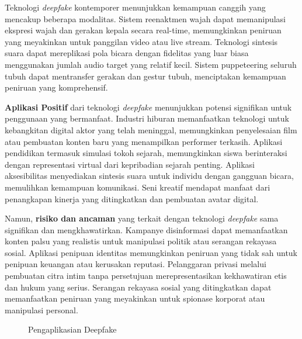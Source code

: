 Teknologi \textit{deepfake} kontemporer menunjukkan kemampuan canggih yang mencakup beberapa modalitas. Sistem reenaktmen wajah dapat memanipulasi ekspresi wajah dan gerakan kepala secara real-time, memungkinkan peniruan yang meyakinkan untuk panggilan video atau live stream. Teknologi sintesis suara dapat mereplikasi pola bicara dengan fidelitas yang luar biasa menggunakan jumlah audio target yang relatif kecil. Sistem puppeteering seluruh tubuh dapat mentransfer gerakan dan gestur tubuh, menciptakan kemampuan peniruan yang komprehensif.

\textbf{Aplikasi Positif} dari teknologi \textit{deepfake} menunjukkan potensi signifikan untuk penggunaan yang bermanfaat. Industri hiburan memanfaatkan teknologi untuk kebangkitan digital aktor yang telah meninggal, memungkinkan penyelesaian film atau pembuatan konten baru yang menampilkan performer terkasih. Aplikasi pendidikan termasuk simulasi tokoh sejarah, memungkinkan siswa berinteraksi dengan representasi virtual dari kepribadian sejarah penting. Aplikasi aksesibilitas menyediakan sintesis suara untuk individu dengan gangguan bicara, memulihkan kemampuan komunikasi. Seni kreatif mendapat manfaat dari penangkapan kinerja yang ditingkatkan dan pembuatan avatar digital.

Namun, \textbf{risiko dan ancaman} yang terkait dengan teknologi \textit{deepfake} sama signifikan dan mengkhawatirkan. Kampanye disinformasi dapat memanfaatkan konten palsu yang realistis untuk manipulasi politik atau serangan rekayasa sosial. Aplikasi penipuan identitas memungkinkan peniruan yang tidak sah untuk penipuan keuangan atau kerusakan reputasi. Pelanggaran privasi melalui pembuatan citra intim tanpa persetujuan merepresentasikan kekhawatiran etis dan hukum yang serius. Serangan rekayasa sosial yang ditingkatkan dapat memanfaatkan peniruan yang meyakinkan untuk spionase korporat atau manipulasi personal.

\begin{figure}[H]
    \centering
    \caption{Pengaplikasian Deepfake}
    \label{fig:deepfake_examples}
\end{figure}

